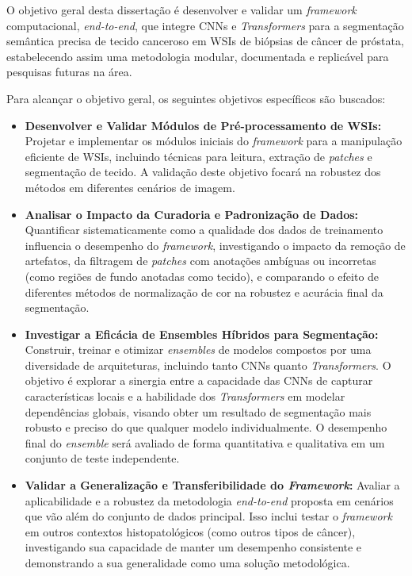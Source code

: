 O objetivo geral desta dissertação é desenvolver e validar um \textit{framework} computacional, \textit{end-to-end}, que integre CNNs e \textit{Transformers} para a segmentação semântica precisa de tecido canceroso em WSIs de biópsias de câncer de próstata, estabelecendo assim uma metodologia modular, documentada e replicável para pesquisas futuras na área.

Para alcançar o objetivo geral, os seguintes objetivos específicos são buscados:
\begin{itemize}
    \item \textbf{Desenvolver e Validar Módulos de Pré-processamento de WSIs:} Projetar e implementar os módulos iniciais do \textit{framework} para a manipulação eficiente de WSIs, incluindo técnicas para leitura, extração de \textit{patches} e segmentação de tecido. A validação deste objetivo focará na robustez dos métodos em diferentes cenários de imagem.

    \item \textbf{Analisar o Impacto da Curadoria e Padronização de Dados:} Quantificar sistematicamente como a qualidade dos dados de treinamento influencia o desempenho do \textit{framework}, investigando o impacto da remoção de artefatos, da filtragem de \textit{patches} com anotações ambíguas ou incorretas (como regiões de fundo anotadas como tecido), e comparando o efeito de diferentes métodos de normalização de cor na robustez e acurácia final da segmentação.

    \item \textbf{Investigar a Eficácia de Ensembles Híbridos para Segmentação:} Construir, treinar e otimizar \textit{ensembles} de modelos compostos por uma diversidade de arquiteturas, incluindo tanto CNNs quanto \textit{Transformers}. O objetivo é explorar a sinergia entre a capacidade das CNNs de capturar características locais e a habilidade dos \textit{Transformers} em modelar dependências globais, visando obter um resultado de segmentação mais robusto e preciso do que qualquer modelo individualmente. O desempenho final do \textit{ensemble} será avaliado de forma quantitativa e qualitativa em um conjunto de teste independente.
    
    \item \textbf{Validar a Generalização e Transferibilidade do \textit{Framework}:} Avaliar a aplicabilidade e a robustez da metodologia \textit{end-to-end} proposta em cenários que vão além do conjunto de dados principal. Isso inclui testar o \textit{framework} em outros contextos histopatológicos (como outros tipos de câncer), investigando sua capacidade de manter um desempenho consistente e demonstrando a sua generalidade como uma solução metodológica.
\end{itemize}

